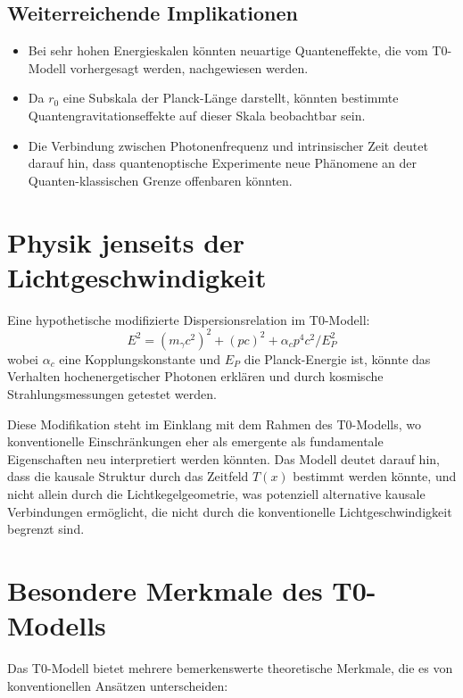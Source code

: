 \documentclass[12pt,a4paper]{article}
\newcommand{\Tfield}{T(x)}
\begin{document}
	\subsection{Weiterreichende Implikationen}
	\begin{itemize}
		\item Bei sehr hohen Energieskalen könnten neuartige Quanteneffekte, die vom T0-Modell vorhergesagt werden, nachgewiesen werden.
		\item Da \(r_0\) eine Subskala der Planck-Länge darstellt, könnten bestimmte Quantengravitationseffekte auf dieser Skala beobachtbar sein.
		\item Die Verbindung zwischen Photonenfrequenz und intrinsischer Zeit deutet darauf hin, dass quantenoptische Experimente neue Phänomene an der Quanten-klassischen Grenze offenbaren könnten.
	\end{itemize}
	
	\section{Physik jenseits der Lichtgeschwindigkeit}
	Eine hypothetische modifizierte Dispersionsrelation im T0-Modell:
	\begin{equation}
		E^2 = (m_\gamma c^2)^2 + (p c)^2 + \alpha_c p^4 c^2 / E_P^2
	\end{equation}
	wobei \(\alpha_c\) eine Kopplungskonstante und \(E_P\) die Planck-Energie ist, könnte das Verhalten hochenergetischer Photonen erklären und durch kosmische Strahlungsmessungen getestet werden.
	
	Diese Modifikation steht im Einklang mit dem Rahmen des T0-Modells, wo konventionelle Einschränkungen eher als emergente als fundamentale Eigenschaften neu interpretiert werden könnten. Das Modell deutet darauf hin, dass die kausale Struktur durch das Zeitfeld \(\Tfield\) bestimmt werden könnte, und nicht allein durch die Lichtkegelgeometrie, was potenziell alternative kausale Verbindungen ermöglicht, die nicht durch die konventionelle Lichtgeschwindigkeit begrenzt sind.
	
	\section{Besondere Merkmale des T0-Modells}
	
	Das T0-Modell bietet mehrere bemerkenswerte theoretische Merkmale, die es von konventionellen Ansätzen unterscheiden:
	
\end{document}
